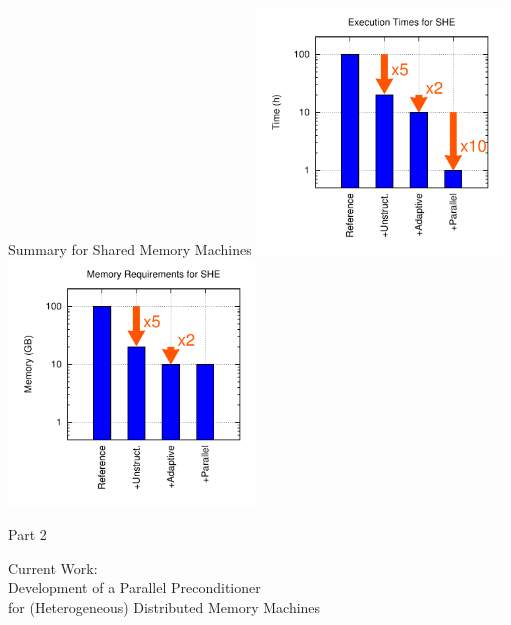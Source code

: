\documentclass[usepdftitle=false,10pt]{beamer}
\begin{document}
\begin{frame}{Summary for Shared Memory Machines}
  \includegraphics[width=0.49\textwidth]{summary-exec-all}
  \includegraphics[width=0.49\textwidth]{summary-memory-all}
\end{frame}



\begin{frame}{Part 2}
 \begin{center}
  Current Work: \\
  Development of a Parallel Preconditioner \\ 
  for (Heterogeneous) Distributed Memory Machines
 \end{center} 
\end{frame}



\end{document}

